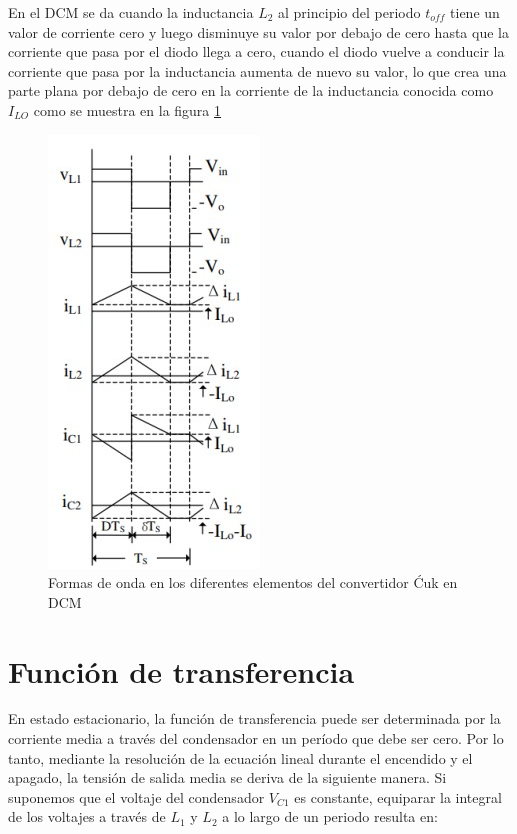 \documentclass[conference]{IEEEtran}
\begin{document}
En el DCM se da cuando la inductancia $L_2$ al principio del periodo $t_{off}$ tiene un valor de corriente cero y luego disminuye su valor por debajo de cero hasta que la corriente que pasa por el diodo llega a cero, cuando el diodo vuelve a conducir la corriente que pasa por la inductancia aumenta de nuevo su valor, lo que crea una parte plana por debajo de cero en la corriente de la inductancia conocida como 
$I_{LO}$ como se muestra en la figura \ref{fig: ondas dcm}

\begin{figure}[h!]
    \centering
    \includegraphics[scale=0.8]{imagenes/dcm.jpg}
    \caption{Formas de onda en los diferentes elementos del convertidor Ćuk en DCM}
    \label{fig: ondas dcm}
\end{figure}

\section{Función de transferencia}
En estado estacionario, la función de transferencia puede ser determinada por la corriente media a través del condensador en un período que debe ser cero. Por lo tanto, mediante la resolución de la ecuación lineal durante el encendido y el apagado, la tensión de salida media se deriva de la siguiente manera. Si suponemos que el voltaje del condensador $V_{C1}$ es constante, equiparar la integral de los voltajes a través de $L_1$ y $L_2$ a lo largo de un periodo resulta en:
\end{document}
